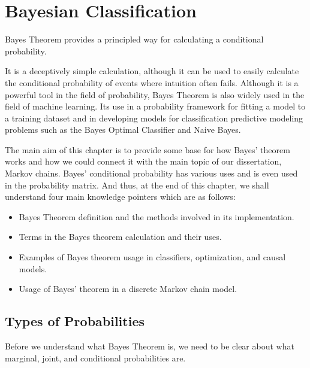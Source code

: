 \chapter{Bayesian Classification} %
\label{cha:bayes} %

Bayes Theorem provides a principled way for calculating a conditional probability.

It is a deceptively simple calculation, although it can be used to easily calculate the conditional probability of events where intuition often fails. Although it is a powerful tool in the field of probability, Bayes Theorem is also widely used in the field of machine learning. Its use in a probability framework for fitting a model to a training dataset and in developing models for classification predictive modeling problems such as the Bayes Optimal Classifier and Naive Bayes.

The main aim of this chapter is to provide some base for how Bayes' theorem works and how we could connect it with the main topic of our dissertation, Markov chains. Bayes' conditional probability has various uses and is even used in the probability matrix. And thus, at the end of this chapter, we shall understand four main knowledge pointers which are as follows:

\begin{itemize}
    \item Bayes Theorem definition and the methods involved in its implementation.
    \item Terms in the Bayes theorem calculation and their uses.
    \item Examples of Bayes theorem usage in classifiers, optimization, and causal models.
    \item Usage of Bayes' theorem in a discrete Markov chain model.
\end{itemize}

\section{Types of Probabilities} %
\label{sec:bayes-theorem-conditional-probability} %

Before we understand what Bayes Theorem is, we need to be clear about what marginal, joint, and conditional probabilities are. 

